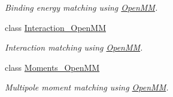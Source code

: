 \begin{DoxyCompactItemize}
\begin{DoxyCompactList}\small\item\em Binding energy matching using \hyperlink{classforcebalance_1_1openmmio_1_1OpenMM}{Open\-M\-M}. \end{DoxyCompactList}\item 
class \hyperlink{classforcebalance_1_1openmmio_1_1Interaction__OpenMM}{Interaction\-\_\-\-Open\-M\-M}
\begin{DoxyCompactList}\small\item\em Interaction matching using \hyperlink{classforcebalance_1_1openmmio_1_1OpenMM}{Open\-M\-M}. \end{DoxyCompactList}\item 
class \hyperlink{classforcebalance_1_1openmmio_1_1Moments__OpenMM}{Moments\-\_\-\-Open\-M\-M}
\begin{DoxyCompactList}\small\item\em Multipole moment matching using \hyperlink{classforcebalance_1_1openmmio_1_1OpenMM}{Open\-M\-M}. \end{DoxyCompactList}\end{DoxyCompactItemize}
